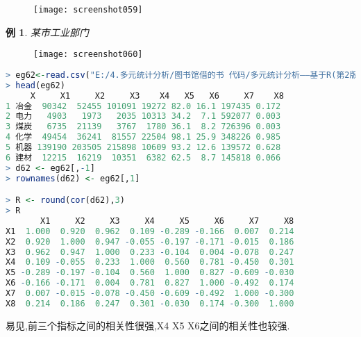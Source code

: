 \documentclass[11pt,a4paper,oneside]{book}
\newtheorem{e}{例}
\begin{document}
\begin{figure}[H]
	\centering
	\texttt{[image: screenshot059]}
\end{figure}

\begin{e}
某市工业部门
\end{e}
\begin{figure}[H]
	\centering
	\texttt{[image: screenshot060]}
\end{figure}

\begin{lstlisting}[language=r]
> eg62<-read.csv("E:/4.多元统计分析/图书馆借的书 代码/多元统计分析——基于R(第2版) R-data/eg6.2.csv")
> head(eg62)
     X     X1     X2     X3    X4   X5   X6     X7    X8
1 冶金  90342  52455 101091 19272 82.0 16.1 197435 0.172
2 电力   4903   1973   2035 10313 34.2  7.1 592077 0.003
3 煤炭   6735  21139   3767  1780 36.1  8.2 726396 0.003
4 化学  49454  36241  81557 22504 98.1 25.9 348226 0.985
5 机器 139190 203505 215898 10609 93.2 12.6 139572 0.628
6 建材  12215  16219  10351  6382 62.5  8.7 145818 0.066
> d62 <- eg62[,-1]
> rownames(d62) <- eg62[,1]

> R <- round(cor(d62),3)
> R
       X1     X2     X3     X4     X5     X6     X7     X8
X1  1.000  0.920  0.962  0.109 -0.289 -0.166  0.007  0.214
X2  0.920  1.000  0.947 -0.055 -0.197 -0.171 -0.015  0.186
X3  0.962  0.947  1.000  0.233 -0.104  0.004 -0.078  0.247
X4  0.109 -0.055  0.233  1.000  0.560  0.781 -0.450  0.301
X5 -0.289 -0.197 -0.104  0.560  1.000  0.827 -0.609 -0.030
X6 -0.166 -0.171  0.004  0.781  0.827  1.000 -0.492  0.174
X7  0.007 -0.015 -0.078 -0.450 -0.609 -0.492  1.000 -0.300
X8  0.214  0.186  0.247  0.301 -0.030  0.174 -0.300  1.000
\end{lstlisting}
易见,前三个指标之间的相关性很强,X4 X5 X6之间的相关性也较强.
\end{document}
